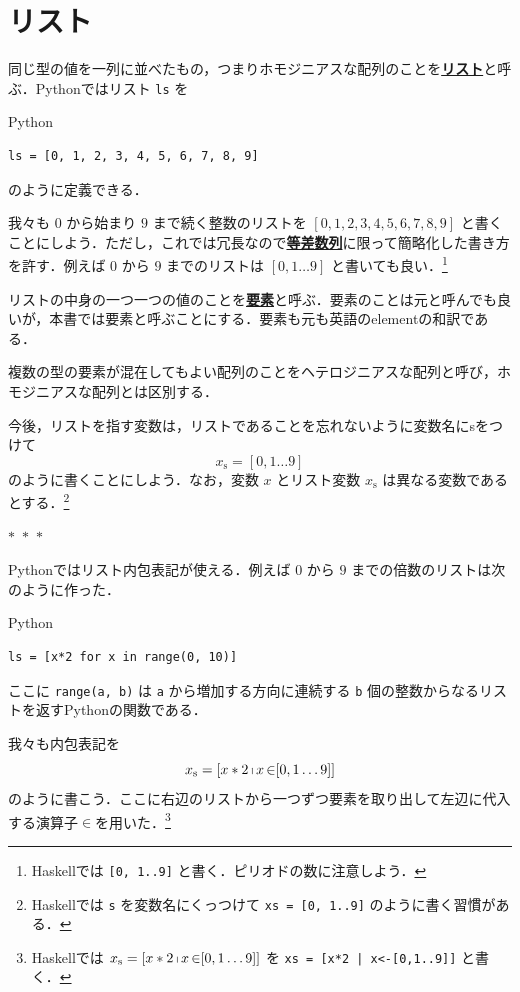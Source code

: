 \documentclass[a5paper,twoside,fleqn,draft]{jsbook}
\newcommand{\separator}{\begin{center}$*$~$*$~$*$\end{center}}
\newcommand{\programminglanguage}[1]{\textsf{#1}}
\newcommand{\haskell}{\programminglanguage{Haskell}}
\newcommand{\python}{\programminglanguage{Python}}
\newcommand{\keyword}[1]{{\underline{\textbf{#1}}}}
\newcommand{\code}[1]{\texttt{#1}}
\newenvironment{pythoncode}{\begin{itembox}[r]{\python}}{\end{itembox}}
\DeclareMathOperator{\mFrom}{\in}
\newcommand{\mList}[1]{{#1}_\mathrm{s}}
\DeclareMathOperator{\mListComp}{\shortmid}
\begin{document}
\section{リスト}

同じ型の値を一列に並べたもの，つまりホモジニアスな配列のことを\keyword{リスト}と呼ぶ．\python ではリスト \code{ls} を
\begin{pythoncode}
\begin{verbatim}
ls = [0, 1, 2, 3, 4, 5, 6, 7, 8, 9]
\end{verbatim}
\end{pythoncode}
のように定義できる．

我々も $0$ から始まり $9$ まで続く整数のリストを $[0,1,2,3,4,5,6,7,8,9]$ と書くことにしよう．ただし，これでは冗長なので\keyword{等差数列}に限って簡略化した書き方を許す．例えば $0$ から $9$ までのリストは $[0,1\dots9]$ と書いても良い．\footnote{\haskell では \code{[0, 1..9]} と書く．ピリオドの数に注意しよう．}

リストの中身の一つ一つの値のことを\keyword{要素}と呼ぶ．要素のことは元と呼んでも良いが，本書では要素と呼ぶことにする．要素も元も英語のelementの和訳である．

複数の型の要素が混在してもよい配列のことをヘテロジニアスな配列と呼び，ホモジニアスな配列とは区別する．

今後，リストを指す変数は，リストであることを忘れないように変数名にsをつけて
\begin{equation}
  \mList{x}
  =[0,1\dots9]
\end{equation}
のように書くことにしよう．なお，変数 $x$ とリスト変数 $\mList{x}$ は異なる変数であるとする．\footnote{\haskell では \code{s} を変数名にくっつけて \code{xs = [0, 1..9]} のように書く習慣がある．}

\separator

\python ではリスト内包表記が使える．例えば $0$ から $9$ までの倍数のリストは次のように作った．
\begin{pythoncode}
\begin{verbatim}
ls = [x*2 for x in range(0, 10)]
\end{verbatim}
\end{pythoncode}
ここに \code{range(a, b)} は \code{a} から増加する方向に連続する \code{b} 個の整数からなるリストを返す\python の関数である．

我々も内包表記を
\begin{equation}
  \mList{x}
  =[x*2\mListComp x\mFrom[0,1\dots9]]
\end{equation}
のように書こう．ここに右辺のリストから一つずつ要素を取り出して左辺に代入する演算子$\mFrom$を用いた．\footnote{\haskell では $\mList{x}=[x*2\mListComp x\mFrom[0,1\dots9]]$ を \code{xs = [x*2 | x<-[0,1..9]]} と書く．}
\end{document}
